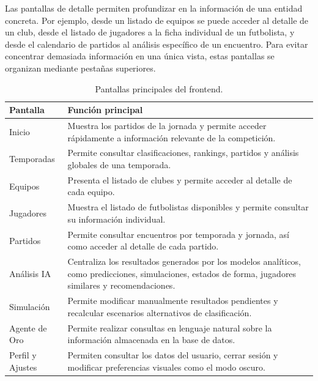 Las pantallas de detalle permiten profundizar en la información de una entidad concreta. Por ejemplo, desde un listado de equipos se puede acceder al detalle de un club, desde el listado de jugadores a la ficha individual de un futbolista, y desde el calendario de partidos al análisis específico de un encuentro. Para evitar concentrar demasiada información en una única vista, estas pantallas se organizan mediante pestañas superiores.

\begin{table}[H]
\centering
\caption{Pantallas principales del frontend.}
\label{tab:pantallas_frontend}
\renewcommand{\arraystretch}{1.2}
\begin{tabular}{|p{5cm}|p{10cm}|}
\hline
\textbf{Pantalla} & \textbf{Función principal} \\ \hline

Inicio &
Muestra los partidos de la jornada y permite acceder rápidamente a información relevante de la competición. \\ \hline

Temporadas &
Permite consultar clasificaciones, rankings, partidos y análisis globales de una temporada. \\ \hline

Equipos &
Presenta el listado de clubes y permite acceder al detalle de cada equipo. \\ \hline

Jugadores &
Muestra el listado de futbolistas disponibles y permite consultar su información individual. \\ \hline

Partidos &
Permite consultar encuentros por temporada y jornada, así como acceder al detalle de cada partido. \\ \hline

Análisis IA &
Centraliza los resultados generados por los modelos analíticos, como predicciones, simulaciones, estados de forma, jugadores similares y recomendaciones. \\ \hline

Simulación &
Permite modificar manualmente resultados pendientes y recalcular escenarios alternativos de clasificación. \\ \hline

Agente de Oro &
Permite realizar consultas en lenguaje natural sobre la información almacenada en la base de datos. \\ \hline

Perfil y Ajustes &
Permiten consultar los datos del usuario, cerrar sesión y modificar preferencias visuales como el modo oscuro. \\ \hline

\end{tabular}
\end{table}

